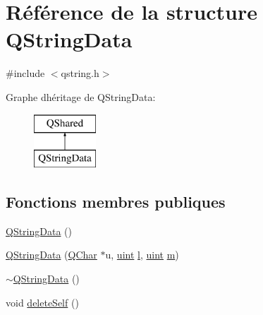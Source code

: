 \hypertarget{struct_q_string_data}{}\section{Référence de la structure Q\+String\+Data}
\label{struct_q_string_data}


{\ttfamily \#include $<$qstring.\+h$>$}

Graphe d\textquotesingle{}héritage de Q\+String\+Data\+:\begin{figure}[H]
\begin{center}
\leavevmode
\includegraphics[height=2.000000cm]{struct_q_string_data}
\end{center}
\end{figure}
\subsection*{Fonctions membres publiques}
\begin{DoxyCompactItemize}
\item 
\hyperlink{struct_q_string_data_afdb51b9ff54329b49b84b358aa5ee4a4}{Q\+String\+Data} ()
\item 
\hyperlink{struct_q_string_data_a03eb4ed3d4573f936840f280c5240038}{Q\+String\+Data} (\hyperlink{class_q_char}{Q\+Char} $\ast$u, \hyperlink{qglobal_8h_a4d3943ddea65db7163a58e6c7e8df95a}{uint} \hyperlink{060__command__switch_8tcl_aff56f84b49947b84b2a304f51cf8e678}{l}, \hyperlink{qglobal_8h_a4d3943ddea65db7163a58e6c7e8df95a}{uint} \hyperlink{060__command__switch_8tcl_a78d127e8bda64d4471ac811ad512fbd9}{m})
\item 
\hyperlink{struct_q_string_data_ad8337cde5aafa3994b7a0c56ba93f5a1}{$\sim$\+Q\+String\+Data} ()
\item 
void \hyperlink{struct_q_string_data_a06038637d9d1d7cd66a6dcea326ed728}{delete\+Self} ()
\end{DoxyCompactItemize}
